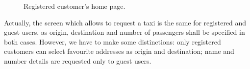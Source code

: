 \begin{figure}%
	\hfill%
	\hfill%
	\caption{Registered customer's home page.}\label{fig:logged}
\end{figure}

\clearpage

Actually, the screen which allows to request a taxi is the same for registered and guest users, as origin, destination and number of passengers shall be specified in both cases. However, we have to make some distinctions: only registered customers can select favourite addresses as origin and destination; name and number details are requested only to guest users. 

